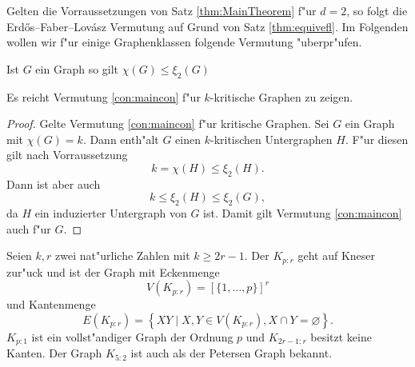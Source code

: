 Gelten die Vorraussetzungen von Satz \ref{thm:MainTheorem} f"ur $d=2$, so folgt die Erd\H{o}s--Faber--Lov\'asz Vermutung auf Grund von Satz \ref{thm:equivefl}. Im Folgenden wollen wir f"ur einige Graphenklassen folgende Vermutung "uberpr"ufen.
\begin{conjecture}
  Ist $G$ ein Graph so gilt $\chi(G) \leq \xi_{2}(G)$
  \label{con:maincon}
\end{conjecture}

\begin{remark}
  Es reicht Vermutung \ref{con:maincon} f"ur $k$-kritische Graphen zu zeigen. 
\end{remark}

\begin{proof}
  Gelte Vermutung \ref{con:maincon} f"ur kritische Graphen.
  Sei $G$ ein Graph mit $\chi(G) = k$. Dann enth"alt $G$ einen $k$-kritischen Untergraphen $H$. F"ur diesen gilt nach Vorraussetzung $$k= \chi(H) \leq \xi_{2}(H).$$ Dann ist aber auch $$k \leq \xi_{2}(H) \leq \xi_{2}(G) ,$$ da $H$ ein induzierter Untergraph von $G$ ist.  Damit gilt Vermutung \ref{con:maincon} auch f"ur $G$.
\end{proof}

Seien $k,r$ zwei nat"urliche Zahlen mit $k\geq 2r-1$. Der  $K_{p:r}$ geht auf Kneser \cite{Kneser55} zur"uck und ist der Graph mit Eckenmenge $$V(K_{p:r}) = [\{1,\dots,p\}]^{r}$$ und Kantenmenge 
$$E(K_{p:r}) = \left\{ XY\;|\; X,Y \in V(K_{p:r}), X \cap Y = \varnothing \right\}.$$ 
$K_{p:1}$ ist ein vollst"andiger Graph der Ordnung $p$ und $K_{2r-1:r}$ besitzt keine Kanten. 
Der Graph $K_{5:2}$ ist auch als der Petersen Graph bekannt.

